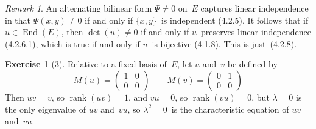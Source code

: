 \documentclass[letterpaper,12pt]{article}
\DeclareMathOperator{\End}{End}
\DeclareMathOperator{\rank}{rank}
\theoremstyle{definition}
\newtheorem*{exer}{Exercise}
\theoremstyle{remark}
\newtheorem*{rmk}{Remark}
\begin{document}
\begin{rmk}
An alternating bilinear form \(\Psi\ne 0\) on~\(E\) captures linear independence in that \(\Psi(x,y)\ne 0\) if and only if \(\{x,y\}\)~is independent (4.2.5). It follows that if \(u\in\End(E)\), then \(\det(u)\ne 0\) if and only if \(u\)~preserves linear independence (4.2.6.1), which is true if and only if \(u\)~is bijective (4.1.8). This is just~(4.2.8).
\end{rmk}

\begin{exer}[3]
Relative to a fixed basis of~\(E\), let \(u\) and~\(v\) be defined by
\[M(u)=\begin{pmatrix}
1&0\\
0&0
\end{pmatrix}
\qquad
M(v)=\begin{pmatrix}
0&1\\
0&0
\end{pmatrix}\]
Then \(uv=v\), so \(\rank(uv)=1\), and \(vu=0\), so \(\rank(vu)=0\), but \(\lambda=0\) is the only eigenvalue of \(uv\) and~\(vu\), so \(\lambda^2=0\)~is the characteristic equation of \(uv\) and~\(vu\).
\end{exer}
\end{document}
